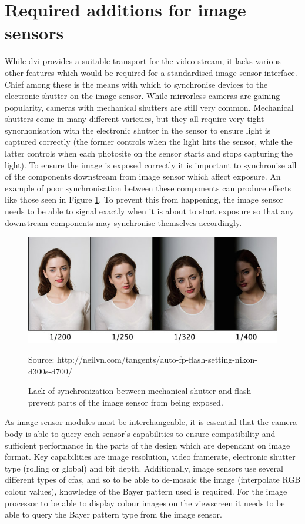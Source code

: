 \section{Required additions for image sensors}

While \gls{dvi} provides a suitable transport for the video stream, it lacks various other features which would be required for a standardised image sensor interface. Chief among these is the means with which to synchronise devices to the electronic shutter on the image sensor. While mirrorless cameras are gaining popularity, cameras with mechanical shutters are still very common. Mechanical shutters come in many different varieties, but they all require very tight syncrhonisation with the electronic shutter in the sensor to ensure light is captured correctly (the former controls when the light hits the sensor, while the latter controls when each photosite on the sensor starts and stops capturing the light). To ensure the image is exposed correctly it is important to synchronise all of the components downstream from image sensor which affect exposure. An example of poor synchronisation between these components can produce effects like those seen in Figure \ref{fig:flash_unsync}. To prevent this from happening, the image sensor needs to be able to signal exactly when it is about to start exposure so that any downstream components may synchronise themselves accordingly.

\begin{figure}
  \centering
  \includegraphics[width=1\textwidth]{./img/flash_unsync.jpg}\par
Source: http://neilvn.com/tangents/auto-fp-flash-setting-nikon-d300s-d700/ 
  \caption{Lack of synchronization between mechanical shutter and flash prevent parts of the image sensor from being exposed.}
  \label{fig:flash_unsync}
\end{figure}

As image sensor modules must be interchangeable, it is essential that the camera body is able to query each sensor's capabilities to ensure compatibility and sufficient performance in the parts of the design which are dependant on image format. Key capabilities are image resolution, video framerate, electronic shutter type (rolling or global) and bit depth. Additionally, image sensors use several different types of \glspl{cfa}, and so to be able to de-mosaic the image (interpolate RGB colour values), knowledge of the Bayer pattern used is required. For the image processor to be able to display colour images on the viewscreen it needs to be able to query the Bayer pattern type from the image sensor. 
 

